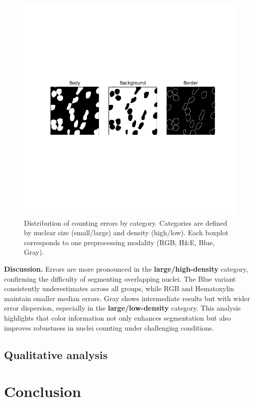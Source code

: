 \documentclass[target=bach,aauheader=,style=]{thud}
\begin{document}
\begin{figure}[h]
    \centering
    \includegraphics[width=\textwidth]{imgs/3ch_binarymask.png}
    \caption{Distribution of counting errors by category. Categories are defined by nuclear size (small/large) and density (high/low). Each boxplot corresponds to one preprocessing modality (RGB, H\&E, Blue, Gray).}
    \label{fig:boxplot_categories}
\end{figure}

\noindent\textbf{Discussion.} 
Errors are more pronounced in the \textbf{large/high-density} category, confirming the difficulty of segmenting overlapping nuclei. 
The Blue variant consistently underestimates across all groups, while RGB and Hematoxylin maintain smaller median errors. 
Gray shows intermediate results but with wider error dispersion, especially in the \textbf{large/low-density} category. 
This analysis highlights that color information not only enhances segmentation but also improves robustness in nuclei counting under challenging conditions.
\section{Qualitative analysis}
\chapter{Conclusion}
\appendix
\end{document}
